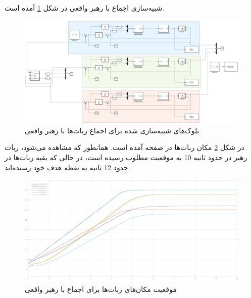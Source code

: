 شبیه‌سازی اجماع با رهبر واقعی در شکل \ref{Fig platoon-simulink} آمده است.
\begin{figure}[!h] 
	\centering
	\includegraphics[scale=0.2]{Images/platoon-simulink.png}
	\caption{بلوک‌های شبیه‌سازی شده برای اجماع ربات‌ها با رهبر واقعی} \label{Fig platoon-simulink}
\end{figure}

در شکل \ref{Fig platoon-pos} مکان ربات‌ها در صفحه آمده است. همانطور که مشاهده می‌شود، ربات رهبر در حدود ثانیه 10 به موقعیت مطلوب رسیده است، در حالی که بقیه ربات‌ها در حدود 12 ثانیه به نقطه هدف خود رسیده‌اند.
\begin{figure}[!h] 
	\centering
	\includegraphics[scale=0.12]{Images/platoon-pos.jpg}
	\caption{موقعیت مکان‌های ربات‌ها برای اجماع با رهبر واقعی} \label{Fig platoon-pos}
\end{figure}

